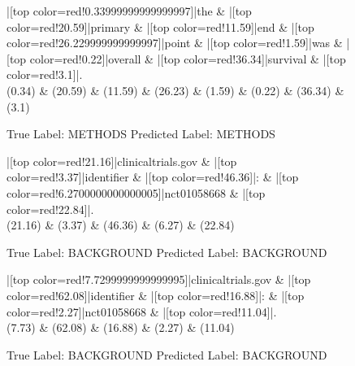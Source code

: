 \documentclass[a4paper, landscape]{article}
\begin{document}
\begin{figure}
\begin{center}
\begin{dependency}
\begin{deptext}
|[top color=red!0.33999999999999997]|the \& |[top color=red!20.59]|primary \& |[top color=red!11.59]|end \& |[top color=red!26.229999999999997]|point \& |[top color=red!1.59]|was \& |[top color=red!0.22]|overall \& |[top color=red!36.34]|survival \& |[top color=red!3.1]|.\\
(0.34) \& (20.59) \& (11.59) \& (26.23) \& (1.59) \& (0.22) \& (36.34) \& (3.1)\\
\end{deptext}
\end{dependency}
\end{center}
\caption{True Label: METHODS Predicted Label: METHODS}
\end{figure}
\clearpage
\begin{figure}
\begin{center}
\begin{dependency}
\begin{deptext}
|[top color=red!21.16]|clinicaltrials.gov \& |[top color=red!3.37]|identifier \& |[top color=red!46.36]|: \& |[top color=red!6.2700000000000005]|nct01058668 \& |[top color=red!22.84]|.\\
(21.16) \& (3.37) \& (46.36) \& (6.27) \& (22.84)\\
\end{deptext}
\end{dependency}
\end{center}
\caption{True Label: BACKGROUND Predicted Label: BACKGROUND}
\end{figure}
\clearpage
\begin{figure}
\begin{center}
\begin{dependency}
\begin{deptext}
|[top color=red!7.7299999999999995]|clinicaltrials.gov \& |[top color=red!62.08]|identifier \& |[top color=red!16.88]|: \& |[top color=red!2.27]|nct01058668 \& |[top color=red!11.04]|.\\
(7.73) \& (62.08) \& (16.88) \& (2.27) \& (11.04)\\
\end{deptext}
\end{dependency}
\end{center}
\caption{True Label: BACKGROUND Predicted Label: BACKGROUND}
\end{figure}
\end{document}

